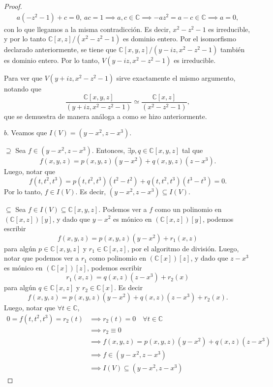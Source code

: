 \documentclass{amsart}
\theoremstyle{plain}
\newcommand{\C}{\mathbb{C}}
\begin{document}
\begin{proof}
		\begin{align*}
			a(-z^{2} - 1) + c = 0,\ ac = 1 \implies a,c \in \C \implies -az^{2} = a - c \in \C \implies a = 0
		,\end{align*}
		con lo que llegamos a la misma contradicción. Es decir, $x^{2} - z^{2} - 1$ es irreducible, y por lo tanto $\C[x,z] \slash (x^{2} - z^{2} - 1)$ es dominio entero. Por el isomorfismo declarado anteriormente, se tiene que $\C[x,y,z] \slash (y - iz, x^{2} - z^{2} - 1)$ también es dominio entero. Por lo tanto, $V(y - iz, x^{2} - z^{2} - 1)$ es irreducible. \par
		Para ver que $V(y + iz, x^{2} - z^{2} - 1)$ sirve exactamente el mismo argumento, notando que
		\[ \frac{\C[x,y,z]}{(y + iz, x^{2} - z^{2} - 1)} \simeq \frac{\C[x,z]}{(x^{2} - z^{2} - 1)}, \]
		que se demuestra de manera análoga a como se hizo anteriormente. \par
		$\boxed{b.}$ Veamos que $I(V) = (y - x^{2}, z - x^{3})$. \par
		$\boxed{\supseteq}$ Sea $f \in (y - x^{2}, z - x^{3})$. Entonces, $\exists p,q \in \C[x,y,z]$ tal que
		\[ f(x,y,z) = p(x,y,z)(y - x^{2}) + q(x,y,z)(z - x^{3}). \]
		Luego, notar que
		\[ f(t,t^{2},t^{3}) = p(t,t^{2},t^{3})(t^{2} - t^{2}) + q(t,t^{2},t^{3})(t^{3} - t^{3}) = 0. \]
		Por lo tanto, $f \in I(V)$. Es decir, $(y - x^{2}, z - x^{3}) \subseteq I(V)$. \par
		$\boxed{\subseteq}$ Sea $f \in I(V) \subseteq \C[x,y,z]$. Podemos ver a $f$ como un polinomio en $(\C[x,z])[y]$, y dado que $y - x^{2}$ es mónico en $(\C[x,z])[y]$, podemos escribir
		\[ f(x,y,z) = p(x,y,z)(y - x^{2}) + r_{1}(x,z) \]
		para algún $p \in \C[x,y,z]$ y $r_{1} \in \C[x,z]$, por el algoritmo de división. Luego, notar que podemos ver a $r_{1}$ como polinomio en $(\C[x])[z]$, y dado que $z - x^{3}$ es mónico en $(\C[x])[z]$, podemos escribir
		\[ r_{1}(x,z) = q(x,z)(z - x^{3}) + r_{2}(x) \]
		para algún $q \in \C[x,z]$ y $r_{2} \in \C[x]$. Es decir
		\[ f(x,y,z) = p(x,y,z)(y - x^{2}) + q(x,z)(z - x^{3}) + r_{2}(x). \]
		Luego, notar que $\forall t \in \C$,
		\begin{align*}
			0 = f(t, t^{2}, t^{3}) = r_{2}(t) &\implies r_{2}(t) = 0 \quad \forall t \in \C \\
			&\implies r_{2} \equiv 0 \\
			&\implies f(x,y,z) = p(x,y,z)(y - x^{2}) + q(x,z)(z - x^{3}) \\
			&\implies f \in (y - x^{2}, z - x^{3}) \\
			&\implies I(V) \subseteq (y - x^{2}, z - x^{3})

\end{align*}
\end{proof}
\end{document}
